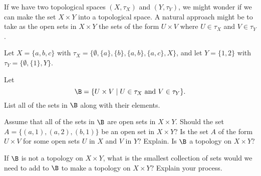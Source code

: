 \label{sec:Product_topology}


\vspace*{-17 pt}
\framebox{
\parbox{\dimexpr\linewidth-3\fboxsep-3\fboxrule}
{\begin{fqs}
\item 

\end{fqs}}}%

\vspace*{13 pt}

If we have two topological spaces $(X, \tau_X)$ and $(Y , \tau_Y)$, we might wonder if we can make the set $X \times Y$ into a topological space. A natural approach might be to take as the open sets in $X \times Y$ the sets of the form $U \times V$ where $U \in \tau_X$  and $V \in \tau_Y$. 

\begin{pa} \label{PA:pd_top_1} Let $X = \{a,b,c\}$ with $\tau_X = \{\emptyset, \{a\}, \{b\}, \{a,b\}, \{a,c\}, X\}$, and let $Y = \{1,2\}$ with $\tau_Y = \{\emptyset, \{1\}, Y\}$. 
\be
\item Let 
\begin{equation} \label{eq:prod_basis}
\B = \{U \times V \mid U \in \tau_X \text{ and } V \in \tau_Y\}.
\end{equation}
List all of the sets in $\B$ along with their elements. 
 
\item Assume that all of the sets in $\B$ are open sets in $X \times Y$. Should the set $A = \{(a,1), (a,2), (b,1)\}$ be an open set in $X \times Y$? Is the set $A$ of the form $U \times V$ for some open sets $U$ in $X$ and $V$ in $Y$? Explain. Is $\B$ a topology on $X \times Y$? 

\item If $\B$ is not a topology on $X \times Y$, what is the smallest collection of sets would we need to add to $\B$ to make a topology on $X \times Y$? Explain your process. 

\ee

\end{pa}

